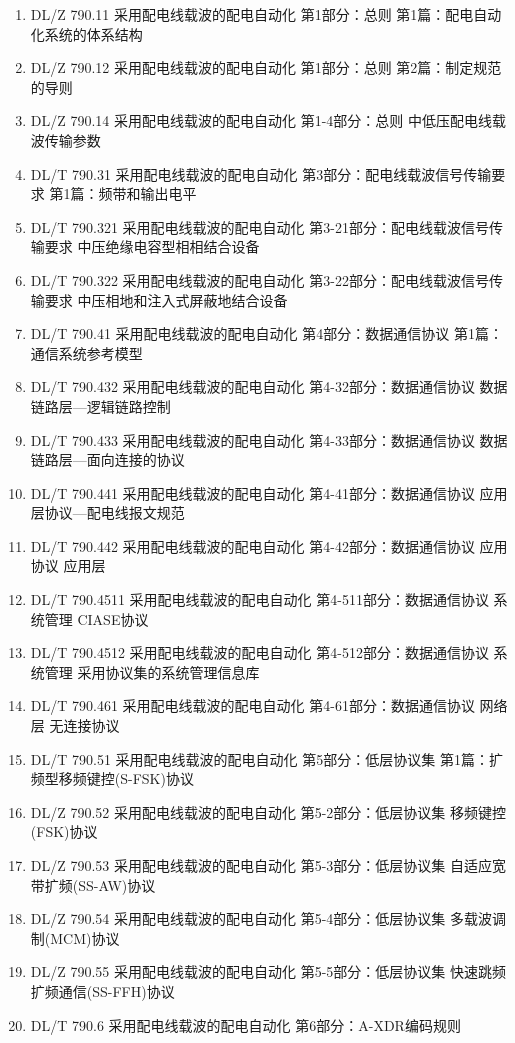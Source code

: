 \documentclass[a4paper,11pt]{ctexart}
\begin{document}
\begin{enumerate}[label=\arabic*),leftmargin=2em,itemsep=0.2em]
\item DL/Z 790.11 采用配电线载波的配电自动化 第1部分：总则 第1篇：配电自动化系统的体系结构
\item DL/Z 790.12 采用配电线载波的配电自动化 第1部分：总则 第2篇：制定规范的导则
\item DL/Z 790.14 采用配电线载波的配电自动化 第1-4部分：总则 中低压配电线载波传输参数
\item DL/T 790.31 采用配电线载波的配电自动化 第3部分：配电线载波信号传输要求 第1篇：频带和输出电平
\item DL/T 790.321 采用配电线载波的配电自动化 第3-21部分：配电线载波信号传输要求 中压绝缘电容型相相结合设备
\item DL/T 790.322 采用配电线载波的配电自动化 第3-22部分：配电线载波信号传输要求 中压相地和注入式屏蔽地结合设备
\item DL/T 790.41 采用配电线载波的配电自动化 第4部分：数据通信协议 第1篇：通信系统参考模型
\item DL/T 790.432 采用配电线载波的配电自动化 第4-32部分：数据通信协议 数据链路层---逻辑链路控制
\item DL/T 790.433 采用配电线载波的配电自动化 第4-33部分：数据通信协议 数据链路层---面向连接的协议
\item DL/T 790.441 采用配电线载波的配电自动化 第4-41部分：数据通信协议 应用层协议---配电线报文规范
\item DL/T 790.442 采用配电线载波的配电自动化 第4-42部分：数据通信协议 应用协议 应用层
\item DL/T 790.4511 采用配电线载波的配电自动化 第4-511部分：数据通信协议 系统管理 CIASE协议
\item DL/T 790.4512 采用配电线载波的配电自动化 第4-512部分：数据通信协议 系统管理 采用协议集的系统管理信息库
\item DL/T 790.461 采用配电线载波的配电自动化 第4-61部分：数据通信协议 网络层 无连接协议
\item DL/T 790.51 采用配电线载波的配电自动化 第5部分：低层协议集 第1篇：扩频型移频键控(S-FSK)协议
\item DL/Z 790.52 采用配电线载波的配电自动化 第5-2部分：低层协议集 移频键控(FSK)协议
\item DL/Z 790.53 采用配电线载波的配电自动化 第5-3部分：低层协议集 自适应宽带扩频(SS-AW)协议
\item DL/Z 790.54 采用配电线载波的配电自动化 第5-4部分：低层协议集 多载波调制(MCM)协议
\item DL/Z 790.55 采用配电线载波的配电自动化 第5-5部分：低层协议集 快速跳频扩频通信(SS-FFH)协议
\item DL/T 790.6 采用配电线载波的配电自动化 第6部分：A-XDR编码规则
\end{enumerate}
\end{document}
